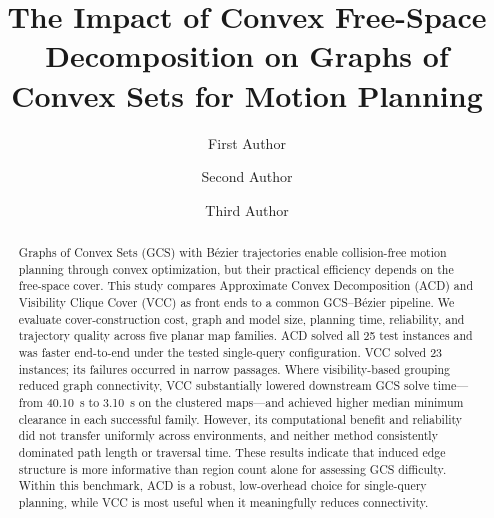 ﻿\documentclass[runningheads]{llncs}
\begin{document}
\title{The Impact of Convex Free-Space Decomposition on Graphs of Convex Sets for Motion Planning}
\author{First Author \and
Second Author \and
Third Author}
%
%
%
\maketitle
%
\begin{abstract}
Graphs of Convex Sets (GCS) with B\'ezier trajectories enable collision-free
motion planning through convex optimization, but their practical efficiency
depends on the free-space cover. This study compares Approximate Convex
Decomposition (ACD) and Visibility Clique Cover (VCC) as front ends to a common
GCS--B\'ezier pipeline. We evaluate cover-construction cost, graph and model
size, planning time, reliability, and trajectory quality across five planar map
families. ACD solved all 25 test instances and was faster end-to-end under the
tested single-query configuration. VCC solved 23 instances; its failures
occurred in narrow passages. Where visibility-based grouping reduced graph
connectivity, VCC substantially lowered downstream GCS solve time---from
40.10~s to 3.10~s on the {clustered} maps---and achieved higher median
minimum clearance in each successful family. However, its computational benefit
and reliability did not transfer uniformly across environments, and neither
method consistently dominated path length or traversal time. These results
indicate that induced edge structure is more informative than region count alone
for assessing GCS difficulty. Within this benchmark, ACD is a robust,
low-overhead choice for single-query planning, while VCC is most useful when it
meaningfully reduces connectivity.

\end{abstract}
%
\end{document}
